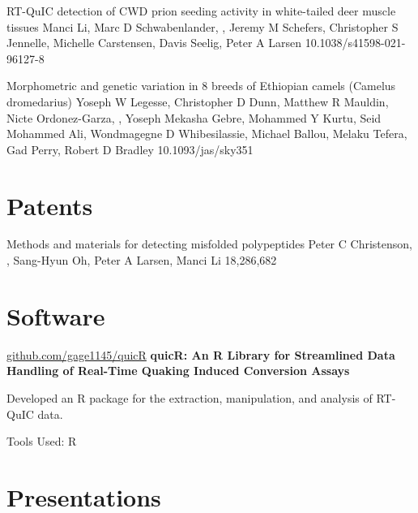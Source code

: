 \documentclass{resume}
\begin{document}
\begin{samepage}
            {RT-QuIC detection of CWD prion seeding activity in white-tailed deer muscle tissues}
            {Manci Li, Marc D Schwabenlander, \me{}, Jeremy M Schefers, Christopher S Jennelle, Michelle Carstensen, Davis Seelig, Peter A Larsen}
            {10.1038/s41598-021-96127-8}

            {Morphometric and genetic variation in 8 breeds of Ethiopian camels (Camelus dromedarius)}
            {Yoseph W Legesse, Christopher D Dunn, Matthew R Mauldin, Nicte Ordonez-Garza, \me{}, Yoseph Mekasha Gebre, Mohammed Y Kurtu, Seid Mohammed Ali, Wondmagegne D Whibesilassie, Michael Ballou, Melaku Tefera, Gad Perry, Robert D Bradley}
            {10.1093/jas/sky351}

        \end{samepage}


    \section{Patents}

        \begin{samepage}
            {Methods and materials for detecting misfolded polypeptides}
            {Peter C Christenson, \me{}, Sang-Hyun Oh, Peter A Larsen, Manci Li}
            {18,286,682}
        \end{samepage}
    

    \section{Software}

        \begin{software}{\href{https://github.com/gage1145/quicR}{github.com/gage1145/quicR}}
            \textbf{quicR: An R Library for Streamlined Data Handling of Real-Time Quaking Induced Conversion Assays}
        \end{software}
        \begin{highlights}
            \item Developed an R package for the extraction, manipulation, and analysis of RT-QuIC data.
            \item Tools Used: R
        \end{highlights}


    \section{Presentations}
\end{document}

